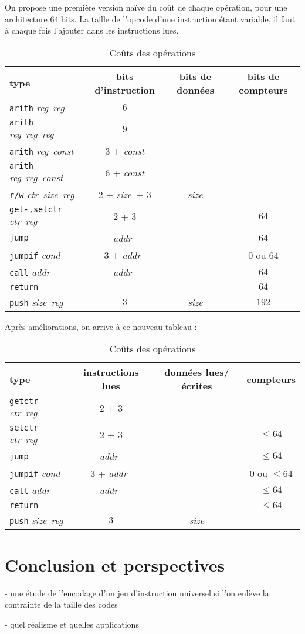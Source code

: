 \documentclass[architecture]{compas2018}
\newcommand{\reg}{\textit{reg}}
\newcommand{\const}{\textit{const}}
\newcommand{\cond}{\textit{cond}}
\newcommand{\ctr}{\textit{ctr}}
\newcommand{\size}{\textit{size}}
\newcommand{\addr}{\textit{addr}}
\begin{document}
\begin{table}[!h]
  \caption{Coûts des opérations}
  \label{tab:costs}
  On propose une première version naïve du coût de chaque opération, pour une architecture 64 bits. La taille de l'opcode d'une instruction étant variable, il faut à chaque fois l'ajouter dans les instructions lues.
  \begin{center}
  \begin{tabular}{|l|c|c|c|}
    \hline  
    type  & bits d'instruction & bits de données & bits de compteurs \\
    \hline  
    \hline
    \texttt{arith} \reg\ \reg\ &  $6$ & & \\
    \hline
    \texttt{arith} \reg\ \reg\ \reg\ & $9$ & & \\
    \hline
    \texttt{arith} \reg\ \const\ & $3$ + \const & & \\
    \hline
    \texttt{arith} \reg\ \reg\ \const\ & $6$ + \const & & \\
    \hline
    \texttt{r/w} \ctr\ \size\ \reg & $2$ + \size\ + $3$ & \size & \\
    \hline
    \texttt{get-,setctr} \ctr\ \reg\ & $2$ + $3$ & & $64$ \\
    \hline
    \texttt{jump} & \addr\ & & $64$ \\
    \hline
    \texttt{jumpif} \cond & $3$ + \addr\ & & $0$ ou $64$\\
    \hline
    \texttt{call} \addr & \addr\ & & $64$\\
    \hline
    \texttt{return} & & & $64$\\
    \hline
    \texttt{push} \size\ \reg & $3$ & \size & $192$\\
    \hline
  \end{tabular}
  \end{center}
Après améliorations, on arrive à ce nouveau tableau :
  \begin{center}
    \begin{tabular}{|l|c|c|c|}
      \hline  
      type  & instructions lues & données lues/écrites & compteurs \\
      \hline  
      \hline
      \texttt{getctr} \ctr\ \reg\ & $2$ + $3$ & & \\
      \hline
      \texttt{setctr} \ctr\ \reg\ & $2$ + $3$ & & $\leqslant 64$ \\
      \hline
      \texttt{jump} & \addr\ & & $\leqslant 64$ \\
      \hline
      \texttt{jumpif} \cond & $3$ + \addr\ & & $0$ ou $\leqslant 64$\\
      \hline
      \texttt{call} \addr & \addr\ & & $\leqslant 64$\\
      \hline
      \texttt{return} & & & $\leqslant64$\\
      \hline
      \texttt{push} \size\ \reg & $3$ & \size &\\
      \hline
    \end{tabular}
  \end{center}
\end{table}

\section{Conclusion et perspectives}

- une étude de l'encodage d'un jeu d'instruction universel si l'on enlève la contrainte de la taille des codes

- quel réalisme et quelles applications


\end{document}
